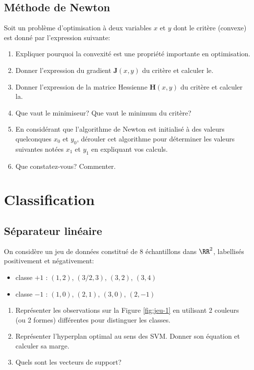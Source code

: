 \documentclass[11pt]{article}
\begin{document}
\subsection{Méthode de Newton}
Soit un problème d'optimisation à deux variables $x$ et $y$ dont le critère (convexe) est donné par l'expression suivante:

\begin{enumerate}
	\item Expliquer pourquoi la convexité est une propriété importante en optimisation.
	\item Donner l'expression du gradient $\mathbf{J}(x,y)$ du critère et calculer le.
	\item Donner l'expression de la matrice Hessienne $\mathbf{H}(x,y)$ du critère et calculer la.
	\item Que vaut le minimiseur? Que vaut le minimum du critère?
	\item En considérant que l'algorithme de Newton est initialisé à des valeurs quelconques $x_0$ et $y_0$, dérouler cet algorithme pour déterminer les valeurs suivantes notées $x_1$ et $y_1$ en expliquant vos calculs.
	\item Que constatez-vous? Commenter.
\end{enumerate}


\section{Classification}

\subsection{Séparateur linéaire}
On considère un jeu de données constitué de $8$ échantillons dans $\RR^2$, labellisés positivement et négativement:
	\begin{itemize}
		\item[-] classe $+1$ : $(1,2)$, $(3/2,3)$, $(3,2)$, $(3,4)$
		\item[-] classe $-1$ : $(1,0)$, $(2,1)$, $(3,0)$, $(2,-1)$
	\end{itemize}
	
\begin{enumerate}
	\item Représenter les observations sur la Figure \ref{fig:jeu-1} en utilisant 2 couleurs (ou 2 formes) différentes pour distinguer les classes.
	\item Représenter l'hyperplan optimal au sens des SVM. Donner son équation et calculer sa marge.
	\item Quels sont les vecteurs de support?
\end{enumerate}
\end{document}
